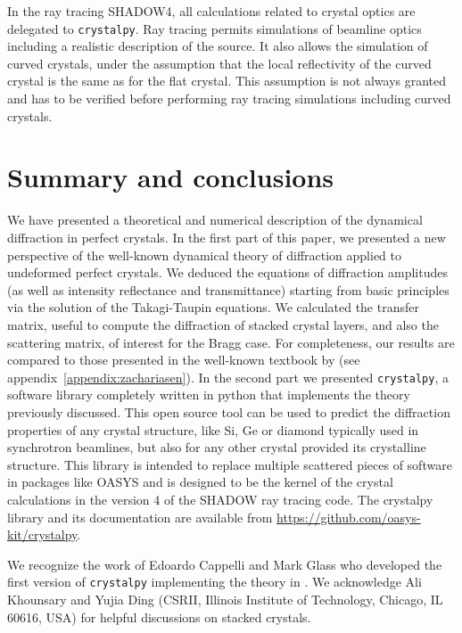 \documentclass{iucr}
\begin{document}
In the ray tracing SHADOW4, all calculations related to crystal optics are delegated to  {\tt crystalpy}. Ray tracing permits simulations of beamline optics including a realistic description of the source. It also allows the simulation of curved crystals, under the assumption that the local reflectivity of the curved crystal is the same as for the flat crystal. This assumption is not always granted and has to be verified before performing ray tracing simulations including curved crystals.

%
\section{Summary and conclusions}
\label{sec:summary}

We have presented a theoretical and numerical description of the dynamical diffraction in perfect crystals. In the first part of this paper, we presented a new perspective of the well-known dynamical theory of diffraction applied to undeformed perfect crystals. We deduced the equations of diffraction amplitudes (as well as intensity reflectance and transmittance) starting from basic principles via the solution of the Takagi-Taupin equations. We calculated the transfer matrix, useful to compute the diffraction of stacked crystal layers, and also the scattering matrix, of interest for the Bragg case. For completeness, our results are compared to those presented in the well-known textbook by \cite{ZachariasenBook} (see appendix~\ref{appendix:zachariasen}).
In the second part we presented {\tt crystalpy}, a software library completely written in python that implements the theory previously discussed. This open source tool can be used to predict the diffraction properties of any crystal structure, like Si, Ge or diamond typically used in synchrotron beamlines, but also for any other crystal provided its crystalline structure. This library is intended to replace multiple scattered pieces of software in packages like OASYS \cite{codeOASYS} and is designed to be the kernel of the crystal calculations in the version 4 of the SHADOW \cite{codeSHADOW} ray tracing code. The crystalpy library and its documentation are available from \url{https://github.com/oasys-kit/crystalpy}. 


We recognize the work of Edoardo Cappelli and Mark Glass who developed the first version of {\tt crystalpy} implementing the theory in \cite{ZachariasenBook}. We acknowledge Ali Khounsary and Yujia Ding (CSRII, Illinois Institute of Technology, Chicago, IL 60616, USA) for helpful discussions on stacked crystals. 
\end{document}
